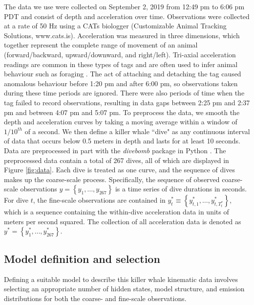 The data we use were collected on September 2, 2019 from 12:49 pm to 6:06 pm PDT and consist of depth and acceleration over time. Observations were collected at a rate of 50 Hz using a CATs biologger (Customizable Animal Tracking Solutions, www.cats.is). Acceleration was measured in three dimensions, which together represent the complete range of movement of an animal (forward/backward, upward/downward, and right/left). Tri-axial acceleration readings are common in these types of tags and are often used to infer animal behaviour such as foraging \citep{Cade:2017,Fehlmann:2017,Wright:2017}. The act of attaching and detaching the tag caused anomalous behaviour before 1:20 pm and after 6:00 pm, so observations taken during these time periods are ignored. There were also periods of time when the tag failed to record observations, resulting in data gaps between 2:25 pm and 2:37 pm and between 4:07 pm and 5:07 pm. To preprocess the data, we smooth the depth and acceleration curves by taking a moving average within a window of $1/10^{th}$ of a second. We then define a killer whale ``dive" as any continuous interval of data that occurs below 0.5 meters in depth and lasts for at least 10 seconds. Data are preprocessed in part with the \textit{divebomb} package in Python \citep{Nunes:2018}. The preprocessed data contain a total of 267 dives, all of which are displayed in Figure \ref{fig:data}. Each dive is treated as one curve, and the sequence of dives makes up the coarse-scale process. Specifically, the sequence of observed coarse-scale observations $y = \left\{y_1,\ldots,y_{267}\right\}$ is a time series of dive durations in seconds. For dive $t$, the fine-scale observations are contained in $y^*_{t} \equiv \left\{y^*_{t,1},\ldots,y^*_{t,T^*_t} \right\}$, which is a sequence containing the within-dive acceleration data in units of meters per second squared. The collection of all acceleration data is denoted as $y^* = \left\{y^*_1,\ldots,y^*_{267}\right\}$.

\subsection{Model definition and selection}
\label{subsec:model_selection}

Defining a suitable model to describe this killer whale kinematic data involves selecting an appropriate number of hidden states, model structure, and emission distributions for both the coarse- and fine-scale observations.

